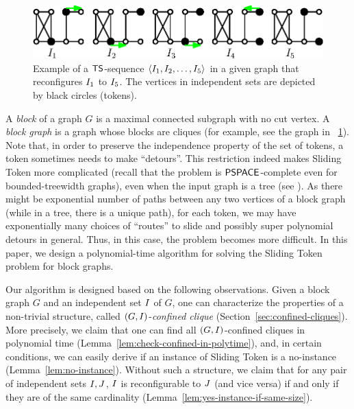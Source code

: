 \documentclass[a4paper]{llncs}
\begin{document}


\begin{figure}[!ht]  %
  \centerline{\includegraphics[scale=1.0]{fig/exa-TS-seq.eps}}
  \caption{
  Example of a ${\sf TS}$-sequence $\langle I_1, I_2, \dots, I_5 \rangle$ in a given graph that reconfigures $I_1$ to $I_5$. The vertices in independent sets are depicted by black circles (tokens). \label{fig:exa-TS-seq}
  }
\end{figure}


A \emph{block} of a graph $G$ is a maximal connected subgraph with no cut vertex.
A \emph{block graph} is a graph whose blocks are cliques (for example, see the graph in \figurename~\ref{fig:exa-TS-seq}).
Note that, in order to preserve the independence property of the set of tokens, a token sometimes needs to make ``detours''.
This restriction indeed makes {\sc Sliding Token} more complicated (recall that the problem is $\sf PSPACE$-complete even for bounded-treewidth graphs), even when the input graph is a tree (see \cite{DDFEHIOOUY2015}).
As there might be exponential number of paths between any two vertices of a block graph (while in a tree, there is a unique path), 
	for each token, we may have exponentially many choices of ``routes'' to slide and possibly super polynomial detours in general.
Thus, in this case, the problem becomes more difficult.
In this paper, we design a polynomial-time algorithm for solving the {\sc Sliding Token} problem for block graphs. 

Our algorithm is designed based on the following observations.
Given a block graph $G$ and an independent set $I$ of $G$, 
	one can characterize the properties of a non-trivial structure, called $(G, I)$-\emph{confined clique} (Section~\ref{sec:confined-cliques}).
More precisely, we claim that one can find all $(G, I)$-confined cliques in polynomial time (Lemma~\ref{lem:check-confined-in-polytime}), 	
	and, in certain conditions, we can easily derive if an instance of {\sc Sliding Token} is a {\sc no}-instance (Lemma~\ref{lem:no-instance}).
Without such a structure, we claim that for any pair of independent sets $I, J$, $I$ is reconfigurable to $J$ (and vice versa) if and only if they are of the same cardinality (Lemma~\ref{lem:yes-instance-if-same-size}).
\end{document}
